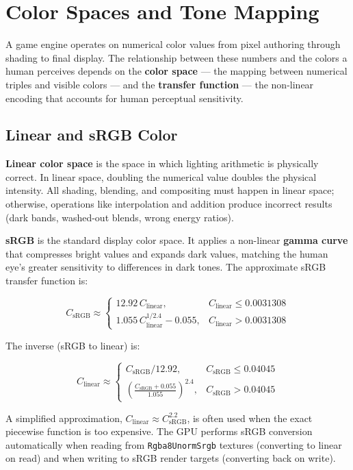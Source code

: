 \documentclass[
  11pt,
  letterpaper,
  DIV=11,
  numbers=noendperiod,
  twoside,
  open=right]{scrreprt}
\begin{document}
\section{Color Spaces and Tone
Mapping}\label{color-spaces-and-tone-mapping}

A game engine operates on numerical color values from pixel authoring
through shading to final display. The relationship between these numbers
and the colors a human perceives depends on the \textbf{color space} ---
the mapping between numerical triples and visible colors --- and the
\textbf{transfer function} --- the non-linear encoding that accounts for
human perceptual sensitivity.

\subsection{Linear and sRGB Color}\label{linear-and-srgb-color}

\textbf{Linear color space} is the space in which lighting arithmetic is
physically correct. In linear space, doubling the numerical value
doubles the physical intensity. All shading, blending, and compositing
must happen in linear space; otherwise, operations like interpolation
and addition produce incorrect results (dark bands, washed-out blends,
wrong energy ratios).

\textbf{sRGB} is the standard display color space. It applies a
non-linear \textbf{gamma curve} that compresses bright values and
expands dark values, matching the human eye's greater sensitivity to
differences in dark tones. The approximate sRGB transfer function is:

\[
C_{\text{sRGB}} \approx \begin{cases}
  12.92 \, C_{\text{linear}}, & C_{\text{linear}} \leq 0.0031308 \\
  1.055 \, C_{\text{linear}}^{1/2.4} - 0.055, & C_{\text{linear}} > 0.0031308
\end{cases}
\]

The inverse (sRGB to linear) is:

\[
C_{\text{linear}} \approx \begin{cases}
  C_{\text{sRGB}} / 12.92, & C_{\text{sRGB}} \leq 0.04045 \\
  \left(\frac{C_{\text{sRGB}} + 0.055}{1.055}\right)^{2.4}, & C_{\text{sRGB}} > 0.04045
\end{cases}
\]

A simplified approximation,
\(C_{\text{linear}} \approx C_{\text{sRGB}}^{2.2}\), is often used when
the exact piecewise function is too expensive. The GPU performs sRGB
conversion automatically when reading from \texttt{Rgba8UnormSrgb}
textures (converting to linear on read) and when writing to sRGB render
targets (converting back on write).
\end{document}
